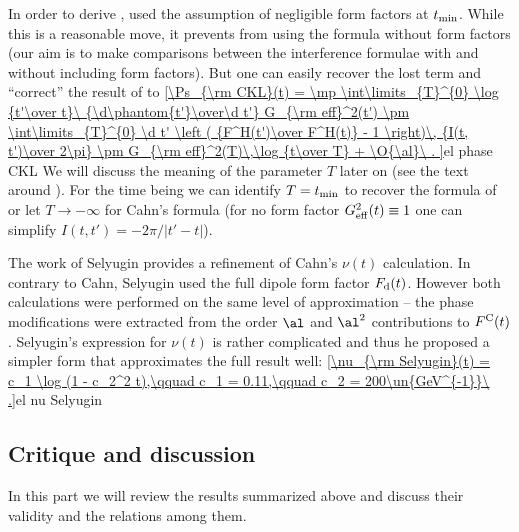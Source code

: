 In order to derive , \KaL{} used the assumption of negligible form factors at $t_{\rm min}$. While this is a reasonable move, it prevents from using the formula without form factors (our aim is to make comparisons between the interference formulae with and without including form factors). But one can easily recover the lost term and ``correct'' the result of \KL{} to
\eject
{}
\eqref{\Ps_{\rm CKL}(t) =
	\mp \int\limits_{T}^{0} \log {t'\over t}\ {\d\phantom{t'}\over\d t'} G_{\rm eff}^2(t')
	\pm \int\limits_{T}^{0} \d t' \left ( {F^H(t')\over F^H(t)} - 1 \right)\, {I(t, t')\over 2\pi}
	\pm G_{\rm eff}^2(T)\,\log {t\over T}
	+ \O{\al}\ .
}{el phase CKL}
We will discuss the meaning of the parameter $T$ later on (see the text around ). For the time being we can identify $T = t_{\rm min}$ to recover the formula of \KL{} or let $T\to -\infty$ for Cahn's formula (for no form factor $G_{\rm eff}^2(t) \equiv 1$ one can simplify $I(t, t') = -2\pi / |t' - t|$).

The work of Selyugin  provides a refinement of Cahn's $\nu(t)$ calculation. In contrary to Cahn, Selyugin used the full dipole form factor $F_{\rm d}(t)$. However both calculations were performed on the same level of approximation -- the phase modifications were extracted from the order $\al$ and $\al^2$ contributions to $F^{\rm C}(t)$. Selyugin's expression for $\nu(t)$ is rather complicated and thus he proposed a simpler form that approximates the full result well:
\eqref{\nu_{\rm Selyugin}(t) = c_1 \log (1 - c_2^2 t),\qquad c_1 = 0.11,\qquad c_2 = 200\un{GeV^{-1}}\ .}{el nu Selyugin}


\subsection[int cd]{Critique and discussion}

In this part we will review the results summarized above and discuss their validity and the relations among them.


